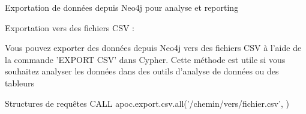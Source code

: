 \begin{frame}{Exportation de données depuis Neo4j pour analyse et reporting}
  \begin{block}{Exportation vers des fichiers CSV :}
 
Vous pouvez exporter des données depuis Neo4j vers des fichiers CSV à l'aide de la commande 'EXPORT CSV' dans Cypher. Cette méthode est utile si vous souhaitez analyser les données dans des outils d'analyse de données ou des tableurs
  \end{block}
  \begin{block}{Structures de requêtes}
CALL apoc.export.csv.all('/chemin/vers/fichier.csv', {})


  \end{block}
\end{frame}